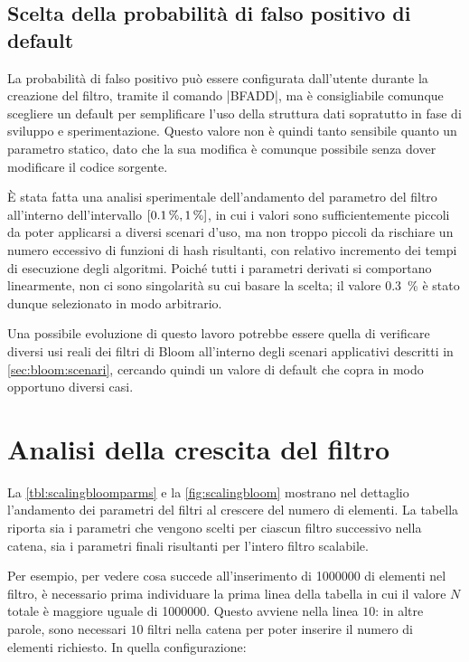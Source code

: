 \subsection{Scelta della probabilità di falso positivo di default}
\label{sec:patch:defaulterror}

La probabilità di falso positivo può essere configurata dall'utente durante la creazione del
filtro, tramite il comando \cverb|BFADD|, ma è consigliabile comunque scegliere un default per
semplificare l'uso della struttura dati sopratutto in fase di sviluppo e sperimentazione. Questo
valore non è quindi tanto sensibile quanto un parametro statico, dato che la sua modifica è comunque
possibile senza dover modificare il codice sorgente.

È stata fatta una analisi sperimentale dell'andamento del parametro del filtro all'interno
dell'intervallo $\interval{\SI{0.1}{\%}}{\SI{1}{\%}}$, in cui i valori sono sufficientemente piccoli
da poter applicarsi a diversi scenari d'uso, ma non troppo piccoli da rischiare un numero eccessivo
di funzioni di hash risultanti, con relativo incremento dei tempi di esecuzione degli algoritmi.
Poiché tutti i parametri derivati si comportano linearmente, non ci sono singolarità su cui basare
la scelta; il valore \SI{0.3}{\%} è stato dunque selezionato in modo arbitrario.

Una possibile evoluzione di questo lavoro potrebbe essere quella di verificare diversi usi reali
dei filtri di Bloom all'interno degli scenari applicativi descritti in \autoref{sec:bloom:scenari}, 
cercando quindi un valore di default che copra in modo opportuno diversi casi.

\section{Analisi della crescita del filtro}

La \autoref{tbl:scalingbloomparms} e la \autoref{fig:scalingbloom} mostrano nel dettaglio
l'andamento dei parametri del filtri al crescere del numero di elementi. La tabella riporta sia i
parametri che vengono scelti per ciascun filtro successivo nella catena, sia i parametri finali
risultanti per l'intero filtro scalabile.

Per esempio, per vedere cosa succede all'inserimento di \num{1000000} di elementi nel filtro,
è necessario prima individuare la prima linea della tabella in cui il valore $N$ totale è maggiore
uguale di \num{1000000}. Questo avviene nella linea $10$: in altre parole, sono necessari $10$
filtri nella catena per poter inserire il numero di elementi richiesto. In quella configurazione:

